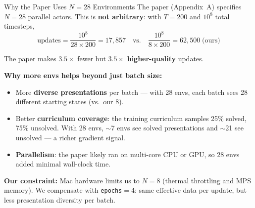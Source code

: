 \documentclass[aspectratio=169,11pt]{beamer}
\begin{document}
\begin{frame}{Why the Paper Uses $N = 28$ Environments}
  \small
  The paper (Appendix~A) specifies $N = 28$ parallel actors.
  This is \textbf{not arbitrary}: with $T = 200$ and $10^8$ total timesteps,
  \[
    \text{updates} = \frac{10^8}{28 \times 200} = 17{,}857
    \quad\text{vs.}\quad
    \frac{10^8}{8 \times 200} = 62{,}500 \;\text{(ours)}
  \]

  The paper makes $3.5\times$ fewer but $3.5\times$ \textbf{higher-quality} updates.

  \medskip
  \textbf{Why more envs helps beyond just batch size:}
  \begin{itemize}\setlength\itemsep{2pt}
    \item More \textbf{diverse presentations} per batch --- with 28 envs, each batch
      sees 28 different starting states (vs.\ our 8).
    \item Better \textbf{curriculum coverage}: the training curriculum samples 25\% solved,
      75\% unsolved. With 28 envs, $\sim$7 envs see solved presentations and
      $\sim$21 see unsolved --- a richer gradient signal.
    \item \textbf{Parallelism}: the paper likely ran on multi-core CPU or GPU,
      so 28 envs added minimal wall-clock time.
  \end{itemize}

  \medskip
  \textbf{Our constraint:} Mac hardware limits us to $N = 8$ (thermal throttling
  and MPS memory).  We compensate with \texttt{epochs$=4$}: same effective data
  per update, but less presentation diversity per batch.
\end{frame}
\end{document}
